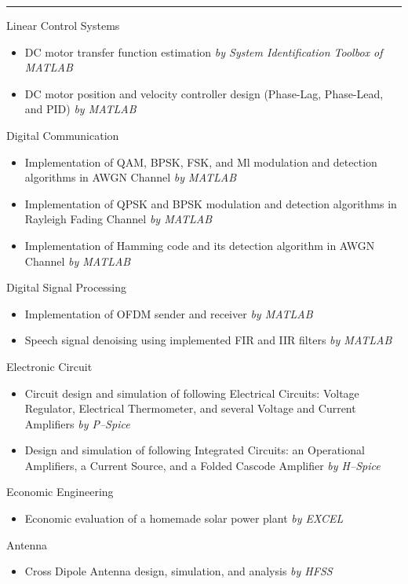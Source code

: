 \documentclass[a4paper,10pt]{article}
\newlength{\cvcolumngapwidth}
\newlength{\cvleftcolumnwidth}
\newlength{\cvrightcolumnwidth}
\newcommand{\cvsectionstyle}[1]{{\normalsize\cvsectionfont\textcolor{cvsectioncolor}{#1}}}
\newcommand{\cvheadingstyle}[1]{{\normalsize\cvheadingfont\textcolor{cvheadingcolor}{#1}}}
\newlength{\cvafteritemskipamount}
\newlength{\cvaftersectionskipamount}
\newlength{\cvbetweensectionandheadingextraskipamount}
\newlength{\cvparskip}
\newcommand{\cvsection}[1]{
    \begin{minipage}[t]{\cvleftcolumnwidth}
        \raggedleft\cvsectionstyle{#1}
    \end{minipage}%
    \hspace{\cvcolumngapwidth}%
    \begin{minipage}[t]{\cvrightcolumnwidth}
        \textcolor{cvrulecolor}{\rule{\cvrightcolumnwidth}{0.3mm}}
    \end{minipage}

    \vspace{\cvaftersectionskipamount}
}
\newcommand{\cvitem}[2]{
    \begin{minipage}[t]{\cvleftcolumnwidth}
        \raggedleft #1
    \end{minipage}%
    \hspace{\cvcolumngapwidth}%
    \begin{minipage}[t]{\cvrightcolumnwidth}
        \setlength{\parskip}{\cvparskip} #2
    \end{minipage}

    \vspace{\cvafteritemskipamount}
}
\begin{document}

\cvsection{Course Project}
\vspace{\cvbetweensectionandheadingextraskipamount}
\cvitem{
    \cvheadingstyle{Linear Control Systems}
}{
    \begin{itemize}[leftmargin=*]
        \item DC motor transfer function estimation \small{\textit{by System Identification Toolbox of MATLAB}}
        \item DC motor position and velocity controller design (Phase-Lag, Phase-Lead, and PID) \small{\textit{by MATLAB}}
    \end{itemize}
}
\cvitem{
    \cvheadingstyle{Digital Communication}
}{
    \begin{itemize}[leftmargin=*]
        \item Implementation of QAM, BPSK, FSK, and Ml modulation and detection algorithms in AWGN Channel \small{\textit{by MATLAB}}
        \item Implementation of QPSK and BPSK modulation and detection algorithms in Rayleigh Fading Channel \small{\textit{by MATLAB}}
        \item Implementation of Hamming code and its detection algorithm in AWGN Channel \small{\textit{by MATLAB}}

    \end{itemize}
}
\cvitem{
    \cvheadingstyle{Digital Signal Processing}
}{
    \begin{itemize}[leftmargin=*]
        \item Implementation of OFDM sender and receiver \small{\textit{by MATLAB}}
        \item Speech signal denoising using implemented FIR and IIR filters  \small{\textit{by MATLAB}}
    \end{itemize}
}
\cvitem{
    \cvheadingstyle{Electronic Circuit}
}{
    \begin{itemize}[leftmargin=*]
        \item Circuit design and simulation of following Electrical Circuits: Voltage Regulator, Electrical Thermometer,
              and several Voltage and Current Amplifiers \small{\textit{by P–Spice}}
        \item Design and simulation of following Integrated Circuits: an Operational Amplifiers, a Current Source,
              and a Folded Cascode Amplifier \small{\textit{by H–Spice}}
    \end{itemize}
}
\cvitem{
    \cvheadingstyle{Economic Engineering}
}{
    \begin{itemize}[leftmargin=*]
        \item Economic evaluation of a homemade solar power plant \small{\textit{by EXCEL}}
    \end{itemize}
}
\cvitem{
    \cvheadingstyle{Antenna}
}{
    \begin{itemize}[leftmargin=*]
        \item Cross Dipole Antenna design, simulation, and analysis \small{\textit{by HFSS}}
    \end{itemize}
}
\end{document}
